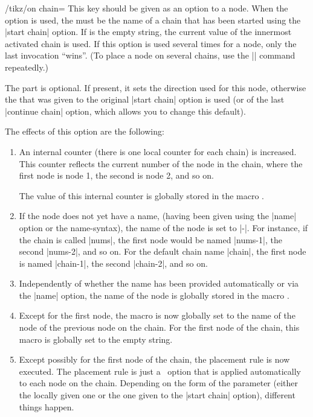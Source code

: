 \begin{key}{/tikz/on chain=}
    This key should be given as an option to a node. When the option is used,
    the  must be the name of a chain that has been started
    using the |start chain| option. If  is the empty string,
    the current value of the innermost activated chain is used. If this option
    is used several times for a node, only the last invocation ``wins''. (To
    place a node on several chains, use the |\chainin| command repeatedly.)

    The  part is optional. If present, it sets the direction
    used for this node, otherwise the  that was given to the
    original |start chain| option is used (or of the last |continue chain|
    option, which allows you to change this default).

    The effects of this option are the following:
    \begin{enumerate}
        \item An internal counter (there is one local counter for each chain)
            is increased. This counter reflects the current number of the node
            in the chain, where the first node is node 1, the second is node 2,
            and so on.

            The value of this internal counter is globally stored in the macro
            \declare{|\tikzchaincount|}.
        \item If the node does not yet have a name, (having been given using
            the |name| option or the name-syntax), the name of the node is set
            to |-|.
            For instance, if the chain is called |nums|, the first node would
            be named |nums-1|, the second |nums-2|, and so on. For the default
            chain name |chain|, the first node is named |chain-1|, the second
            |chain-2|, and so on.
        \item Independently of whether the name has been provided automatically
            or via the |name| option, the name of the node is globally stored
            in the macro \declare{|\tikzchaincurrent|}.
        \item Except for the first node, the macro
            \declare{|\tikzchainprevious|} is now globally set to the name of
            the node of the previous node on the chain. For the first node of
            the chain, this macro is globally set to the empty string.
        \item Except possibly for the first node of the chain, the placement
            rule is now executed. The placement rule is just a \tikzname\
            option that is applied automatically to each node on the chain.
            Depending on the form of the \meta{direction} parameter (either the
            locally given one or the one given to the |start chain| option),
            different things happen.


\end{enumerate}
\end{key}
